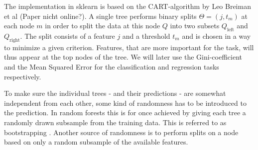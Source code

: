 The implementation in sklearn is based on the CART-algorithm by 
Leo Breiman et al (Paper nicht online?).
A single tree performs binary splits $\Theta = (j, t_m)$ 
at each node $m$ in order to split 
the data at this node $Q$ into two subsets 
$Q_\text{left}$
and 
$Q_\text{right}$.
The split consists of a feature $j$ and a threshold $t_m$ and is 
chosen in a way to minimize a given criterion.
Features, that are more important for the task, will
thus appear at the top nodes of the tree.
We will later use the Gini-coefficient and the Mean Squared Error
for the classification and regression tasks respectively.

To make sure the individual trees 
- and their predictions - 
are somewhat independent from each other,
some kind of randomness has to be introduced to the prediction.
In random forests this is for once achieved by giving each tree a 
randomly drawn subsample from the training data.
This is referred to as bootstrapping \cite{efron1992bootstrap}.
Another source of randomness is to perform splits on a node 
based on only a random subsample of the available features.

